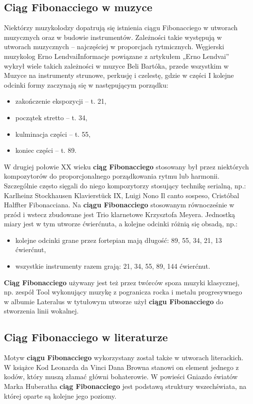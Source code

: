 \documentclass[12pt,a4paper]{article}
\begin{document}
\subsection{\large{Ciąg Fibonacciego w muzyce}}
Niektórzy muzykolodzy dopatrują się istnienia ciągu Fibonacciego w utworach muzycznych oraz w budowie instrumentów. Zależności takie występują w utworach muzycznych – najczęściej w proporcjach rytmicznych. Węgierski muzykolog Erno Lendvai﻿Informacje powiązane z artykułem „Erno Lendvai” wykrył wiele takich zależności w muzyce Beli Bartóka, przede wszystkim w Muzyce na instrumenty strunowe, perkusję i czelestę, gdzie w części I kolejne odcinki formy zaczynają się w następującym porządku:
\begin{itemize}
\item zakończenie ekspozycji – t. 21,
\item początek stretto – t. 34,
\item kulminacja części – t. 55,
\item koniec części – t. 89.
\end{itemize}
W drugiej połowie XX wieku \textbf{ciąg Fibonacciego} stosowany był przez niektórych kompozytorów do proporcjonalnego porządkowania rytmu lub harmonii. Szczególnie często sięgali do niego kompozytorzy stosujący technikę serialną, np.: Karlheinz Stockhausen Klavierstück IX, Luigi Nono Il canto sospeso, Cristóbal Halffter Fibonacciana. Na \textbf{ciągu Fibonacciego} stosowanym równocześnie w przód i wstecz zbudowane jest Trio klarnetowe Krzysztofa Meyera. Jednostką miary jest w tym utworze ćwierćnuta, a kolejne odcinki różnią się obsadą, np.:
\begin{itemize}
\item kolejne odcinki grane przez fortepian mają długość: 89, 55, 34, 21, 13 ćwierćnut,
\item wszystkie instrumenty razem grają: 21, 34, 55, 89, 144 ćwierćnut.
\end{itemize}
\textbf{Ciąg Fibonacciego} używany jest też przez twórców spoza muzyki klasycznej, np. zespół Tool wykonujący muzykę z pogranicza rocka i metalu progresywnego w albumie Lateralus w tytułowym utworze użył \textbf{ciągu Fibonacciego} do stworzenia linii wokalnej.
\newpage
\subsection{\large{Ciąg Fibonacciego w literaturze}}
Motyw \textbf{ciągu Fibonacciego} wykorzystany został także w utworach literackich. W książce Kod Leonarda da Vinci Dana Browna stanowi on element jednego z kodów, który muszą złamać główni bohaterowie. W powieści Gniazdo światów Marka Huberatha \textbf{ciąg Fibonacciego} jest podstawą struktury wszechświata, na której oparte są kolejne jego poziomy.
\end{document}
